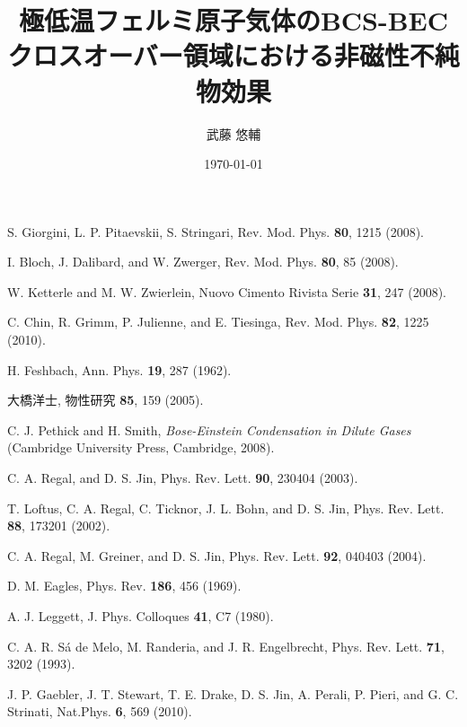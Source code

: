 \documentclass[12pt]{jsbook}
\begin{document}
\title{極低温フェルミ原子気体のBCS-BEC クロスオーバー領域における非磁性不純物効果}
\author{武藤 悠輔}
\date{\today}
%
\tableofcontents





\appendix


\begin{thebibliography}{9}
S. Giorgini, L. P. Pitaevskii, S. Stringari, Rev. Mod. Phys. {\bf 80}, 1215 (2008).

I. Bloch, J. Dalibard, and W. Zwerger, Rev. Mod. Phys. {\bf 80}, 85 (2008).

W. Ketterle and M. W. Zwierlein, Nuovo Cimento Rivista Serie {\bf 31}, 247 (2008).

C. Chin, R. Grimm, P. Julienne, and E. Tiesinga, Rev. Mod. Phys. {\bf 82}, 1225 (2010).

H. Feshbach, Ann. Phys. {\bf 19}, 287 (1962).

大橋洋士, 物性研究 {\bf 85}, 159 (2005).

C. J. Pethick and H. Smith, {\it Bose-Einstein Condensation in Dilute Gases} (Cambridge University Press, Cambridge, 2008).

C. A. Regal, and D. S. Jin, Phys. Rev. Lett. {\bf 90}, 230404 (2003).

T. Loftus, C. A. Regal, C. Ticknor, J. L. Bohn, and D. S. Jin, Phys. Rev. Lett. {\bf 88}, 173201 (2002).

C. A. Regal, M. Greiner, and D. S. Jin, Phys. Rev. Lett. {\bf 92}, 040403 (2004).

D. M. Eagles, Phys. Rev. {\bf 186}, 456 (1969).

A. J. Leggett, J. Phys. Colloques {\bf 41}, C7 (1980).

C. A. R. S\'a de Melo, M. Randeria, and J. R. Engelbrecht, Phys. Rev. Lett. {\bf 71}, 3202 (1993).

J. P. Gaebler, J. T. Stewart, T. E. Drake, D. S. Jin, A. Perali, P. Pieri, and G. C. Strinati, Nat.Phys. {\bf 6}, 569 (2010).



\end{thebibliography}
\end{document}
